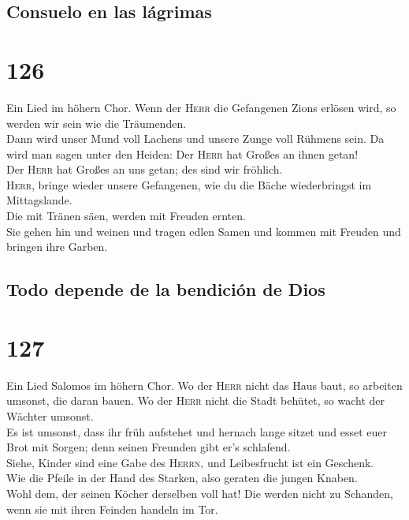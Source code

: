 \hypertarget{consuelo-en-las-luxe1grimas}{%
\subsection{Consuelo en las
lágrimas}\label{consuelo-en-las-luxe1grimas}}

\hypertarget{section-125}{%
\section{126}\label{section-125}}

 Ein Lied im höhern Chor. Wenn der \textsc{Herr} die
Gefangenen Zions erlösen wird, so werden wir sein wie die Träumenden.\\
 Dann wird unser Mund voll Lachens und unsere Zunge voll
Rühmens sein. Da wird man sagen unter den Heiden: Der \textsc{Herr} hat
Großes an ihnen getan!\\
 Der \textsc{Herr} hat Großes an uns getan; des sind wir
fröhlich.\\
 \textsc{Herr}, bringe wieder unsere Gefangenen, wie du
die Bäche wiederbringst im Mittagslande.\\
 Die mit Tränen säen, werden mit Freuden ernten.\\
 Sie gehen hin und weinen und tragen edlen Samen und
kommen mit Freuden und bringen ihre Garben.

\hypertarget{todo-depende-de-la-bendiciuxf3n-de-dios}{%
\subsection{Todo depende de la bendición de
Dios}\label{todo-depende-de-la-bendiciuxf3n-de-dios}}

\hypertarget{section-126}{%
\section{127}\label{section-126}}

 Ein Lied Salomos im höhern Chor. Wo der \textsc{Herr}
nicht das Haus baut, so arbeiten umsonst, die daran bauen. Wo der
\textsc{Herr} nicht die Stadt behütet, so wacht der Wächter umsonst.\\
 Es ist umsonst, dass ihr früh aufstehet und hernach lange
sitzet und esset euer Brot mit Sorgen; denn seinen Freunden gibt er's
schlafend.\\
 Siehe, Kinder sind eine Gabe des \textsc{Herrn}, und
Leibesfrucht ist ein Geschenk.\\
 Wie die Pfeile in der Hand des Starken, also geraten die
jungen Knaben.\\
 Wohl dem, der seinen Köcher derselben voll hat! Die
werden nicht zu Schanden, wenn sie mit ihren Feinden handeln im Tor.

